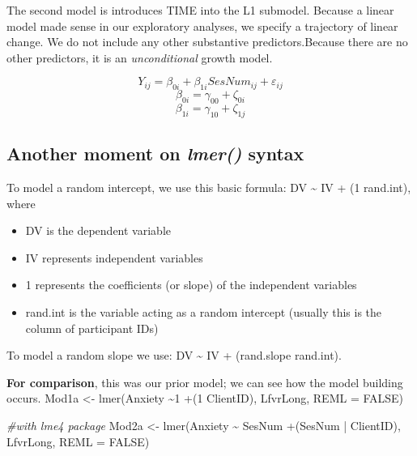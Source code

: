\documentclass[
  11pt,
]{book}
\newenvironment{Shaded}{\begin{snugshade}}{\end{snugshade}}
\newcommand{\AttributeTok}[1]{\textcolor[rgb]{0.77,0.63,0.00}{#1}}
\newcommand{\CommentTok}[1]{\textcolor[rgb]{0.56,0.35,0.01}{\textit{#1}}}
\newcommand{\ConstantTok}[1]{\textcolor[rgb]{0.00,0.00,0.00}{#1}}
\newcommand{\FunctionTok}[1]{\textcolor[rgb]{0.00,0.00,0.00}{#1}}
\newcommand{\NormalTok}[1]{#1}
\newcommand{\OtherTok}[1]{\textcolor[rgb]{0.56,0.35,0.01}{#1}}
\newcommand{\SpecialCharTok}[1]{\textcolor[rgb]{0.00,0.00,0.00}{#1}}
\providecommand{\tightlist}{%
  \setlength{\itemsep}{0pt}\setlength{\parskip}{0pt}}
\begin{document}
The second model is introduces TIME into the L1 submodel. Because a linear model made sense in our exploratory analyses, we specify a trajectory of linear change. We do not include any other substantive predictors.Because there are no other predictors, it is an \emph{unconditional} growth model.

\[Y_{ij}=\beta _{0i}+\beta _{1i}SesNum_{ij}+\varepsilon _{ij}\]
\[\beta _{0i}=\gamma _{00} + \zeta _{0i}\]
\[\beta _{1i}=\gamma _{10} + \zeta _{1j}\]

\hypertarget{another-moment-on-lmer-syntax}{%
\subsection{\texorpdfstring{Another moment on \emph{lmer()} syntax}{Another moment on lmer() syntax}}\label{another-moment-on-lmer-syntax}}

To model a random intercept, we use this basic formula: DV \textasciitilde{} IV + (1 \textbar{} rand.int), where

\begin{itemize}
\tightlist
\item
  DV is the dependent variable
\item
  IV represents independent variables
\item
  1 represents the coefficients (or slope) of the independent variables
\item
  rand.int is the variable acting as a random intercept (usually this is the column of participant IDs)
\end{itemize}

To model a random slope we use: DV \textasciitilde{} IV + (rand.slope \textbar{} rand.int).

\textbf{For comparison}, this was our prior model; we can see how the model building occurs.
Mod1a \textless- lmer(Anxiety \textasciitilde1 +(1 \textbar{} ClientID), LfvrLong, REML = FALSE)

\begin{Shaded}
\begin{Highlighting}[]
\CommentTok{\#with lme4 package}
\NormalTok{Mod2a }\OtherTok{\textless{}{-}} \FunctionTok{lmer}\NormalTok{(Anxiety }\SpecialCharTok{\textasciitilde{}}\NormalTok{ SesNum }\SpecialCharTok{+}\NormalTok{(SesNum }\SpecialCharTok{|}\NormalTok{ ClientID), LfvrLong, }\AttributeTok{REML =} \ConstantTok{FALSE}\NormalTok{)}
\end{Highlighting}
\end{Shaded}
\end{document}
